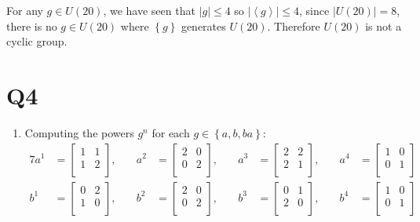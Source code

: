 \documentclass[a4paper, 11pt]{article}
\def\set#1{\left\{ #1 \right\}}
\def\gen#1{\left\langle#1 \right\rangle}
\def\abs#1{\left|#1\right|}
\begin{document}
\begin{enumerate}[label=(\alph*)]
	For any $g\in U(20)$, we have seen that $|g|\leq 4$ so $\abs{\gen{g}}\leq 4$, since $\abs{U(20)}=8$, there is no $g\in U(20)$ where $\set{g}$ generates $U(20)$. Therefore $U(20)$ is not a cyclic group. 
\end{enumerate}

\pagebreak
\section*{Q4}
\begin{enumerate}[label=(\alph*)]
	\item Computing the powers $g^n$ for each $g\in\set{a,b,ba}$:
	\begin{alignat*}{7}
	a^1&=\begin{bmatrix}
		1 & 1 \\
		1 & 2 \\
	\end{bmatrix},\quad
	&a^2&=\begin{bmatrix}
		2 & 0 \\
		0 & 2 \\
	\end{bmatrix},\quad
	&a^3&=\begin{bmatrix}
		2 & 2 \\
		2 & 1 \\
	\end{bmatrix},\quad
	&a^4&=\begin{bmatrix}
		1 & 0 \\
		0 & 1 \\
	\end{bmatrix}
	\\
	b^1&=\begin{bmatrix}
		0 & 2 \\
		1 & 0 \\
	\end{bmatrix},\quad
	&b^2&=\begin{bmatrix}
		2 & 0 \\
		0 & 2 \\
	\end{bmatrix},\quad
	&b^3&=\begin{bmatrix}
		0 & 1 \\
		2 & 0 \\
	\end{bmatrix},\quad
	&b^4&=\begin{bmatrix}
		1 & 0 \\
		0 & 1 \\
	\end{bmatrix}
	\\

\end{alignat*}
\end{enumerate}
\end{document}
